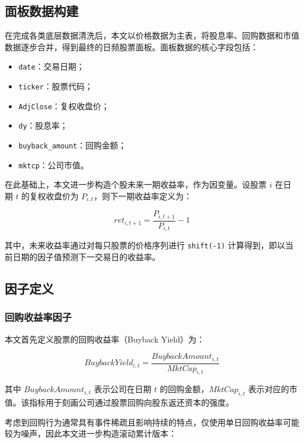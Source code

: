 \documentclass[a4paper,10pt]{article}
\begin{document}
\subsection{面板数据构建}

在完成各类底层数据清洗后，本文以价格数据为主表，将股息率、回购数据和市值数据逐步合并，得到最终的日频股票面板。面板数据的核心字段包括：

\begin{itemize}
    \item \texttt{date}：交易日期；
    \item \texttt{ticker}：股票代码；
    \item \texttt{AdjClose}：复权收盘价；
    \item \texttt{dy}：股息率；
    \item \texttt{buyback\_amount}：回购金额；
    \item \texttt{mktcp}：公司市值。
\end{itemize}

在此基础上，本文进一步构造个股未来一期收益率，作为因变量。设股票 $i$ 在日期 $t$ 的复权收盘价为 $P_{i,t}$，则下一期收益率定义为：

\begin{equation}
ret_{i,t+1} = \frac{P_{i,t+1}}{P_{i,t}} - 1
\end{equation}

其中，未来收益率通过对每只股票的价格序列进行 \texttt{shift(-1)} 计算得到，即以当前日期的因子值预测下一交易日的收益率。

\subsection{因子定义}

\subsubsection{回购收益率因子}

本文首先定义股票的回购收益率（Buyback Yield）为：

\begin{equation}
BuybackYield_{i,t} = \frac{BuybackAmount_{i,t}}{MktCap_{i,t}}
\end{equation}

其中 $BuybackAmount_{i,t}$ 表示公司在日期 $t$ 的回购金额，$MktCap_{i,t}$ 表示对应的市值。该指标用于刻画公司通过股票回购向股东返还资本的强度。

考虑到回购行为通常具有事件稀疏且影响持续的特点，仅使用单日回购收益率可能较为噪声，因此本文进一步构造滚动累计版本：
\end{document}
